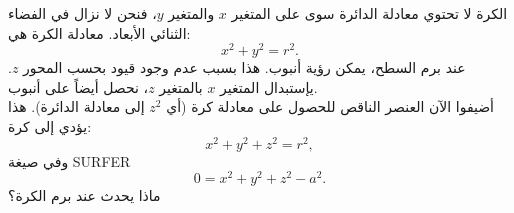 \begin{surferPage}[Sphere]{الكرة}
لا تحتوي معادلة الدائرة سوى على المتغير $x$ والمتغير $y$، فنحن لا نزال في الفضاء الثنائي الأبعاد.
معادلة الكرة هي:
\[x^2+y^2=r^2.\]
عند برم السطح، يمكن رؤية أنبوب. هذا بسبب عدم وجود قيود بحسب المحور $z$. يإستبدال المتغير $x$ بالمتغير $z$، نحصل أيضاً على أنبوب.\\
أضيفوا الآن العنصر الناقص للحصول على معادلة كرة (أي $z^2$ إلى معادلة الدائرة). هذا يؤدي إلى كرة:
\[x^2+y^2+z^2=r^2,\]
وفي صيغة \textenglish{SURFER}
\[0=x^2+y^2+z^2-a^2.\]
ماذا يحدث عند برم الكرة؟
\end{surferPage}
